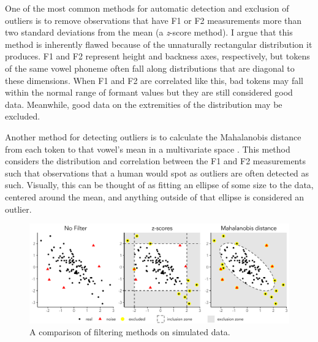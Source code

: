 One of the most common methods for automatic detection and exclusion of outliers is to remove observations that have F1 or F2 measurements more than two standard deviations from the mean (a \textit{z}-score method). I argue that this method is inherently flawed because of the unnaturally rectangular distribution it produces. F1 and F2 represent height and backness axes, respectively, but tokens of the same vowel phoneme often fall along distributions that are diagonal to these dimensions. When F1 and F2 are correlated like this, bad tokens may fall within the normal range of formant values but they are still considered good data. Meanwhile, good data on the extremities of the distribution may be excluded.

Another method for detecting outliers is to calculate the Mahalanobis distance from each token to that vowel’s mean in a multivariate space \citep{mahalanobis_1936, renwick_ladd_2016, labov_etal_2013, evanini_2009_diss}. This method considers the distribution and correlation between the F1 and F2 measurements such that observations that a human would spot as outliers are often detected as such. Visually, this can be thought of as fitting an ellipse of some size to the data, centered around the mean, and anything outside of that ellipse is considered an outlier.

\begin{figure}[tb]
    \includegraphics[width = 6.5in]{Figures/methods/filtering.pdf}
    \caption[A comparison of filtering methods]{A comparison of filtering methods on simulated data.}
    \label{fig:filtering}
\end{figure}

